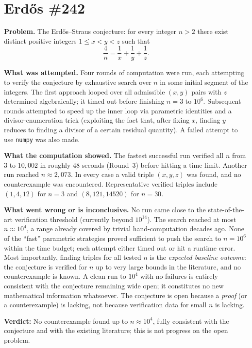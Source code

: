 \section{Erd\H{o}s \#242}

\textbf{Problem.} The Erd\H{o}s--Straus conjecture: for every integer $n > 2$ there exist
distinct positive integers $1 \le x < y < z$ such that
\[
  \frac{4}{n} = \frac{1}{x} + \frac{1}{y} + \frac{1}{z}.
\]

\textbf{What was attempted.} Four rounds of computation were run, each attempting to
verify the conjecture by exhaustive search over $n$ in some initial segment of the
integers.  The first approach looped over all admissible $(x,y)$ pairs with $z$ determined
algebraically; it timed out before finishing $n = 3$ to $10^{6}$.  Subsequent rounds
attempted to speed up the inner loop via parametric identities and a divisor-enumeration
trick (exploiting the fact that, after fixing $x$, finding $y$ reduces to finding a
divisor of a certain residual quantity).  A failed attempt to use \texttt{numpy} was
also made.

\textbf{What the computation showed.} The fastest successful run verified all $n$ from
$3$ to $10{,}002$ in roughly $48$ seconds (Round~3) before hitting a time limit.
Another run reached $n \approx 2{,}073$.  In every case a valid triple $(x,y,z)$ was
found, and no counterexample was encountered.  Representative verified triples include
$(1,4,12)$ for $n=3$ and $(8,121,14520)$ for $n=30$.

\textbf{What went wrong or is inconclusive.} No run came close to the
state-of-the-art verification threshold (currently beyond $10^{14}$).  The search
reached at most $n \approx 10^{4}$, a range already covered by
trivial hand-computation decades ago.  None of the ``fast'' parametric strategies
proved sufficient to push the search to $n = 10^{6}$ within the time budget; each
attempt either timed out or hit a runtime error.  Most importantly, finding triples
for all tested $n$ is the \emph{expected baseline outcome}: the conjecture is verified
for $n$ up to very large bounds in the literature, and no counterexample is known.
A clean run to $10^{4}$ with no failures is entirely consistent with the conjecture
remaining wide open; it constitutes no new mathematical information whatsoever.
The conjecture is open because a \emph{proof} (or a counterexample) is lacking, not
because verification data for small $n$ is lacking.

\textbf{Verdict:} No counterexample found up to $n \approx 10^{4}$, fully consistent with
the conjecture and with the existing literature; this is not progress on the open problem.